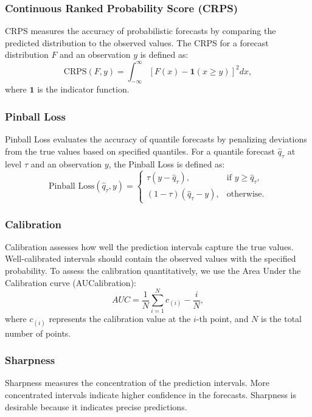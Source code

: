\documentclass{article}
\begin{document}
\subsubsection{Continuous Ranked Probability Score (CRPS)}
CRPS measures the accuracy of probabilistic forecasts by comparing the predicted distribution to the observed values. The CRPS for a forecast distribution \( F \) and an observation \( y \) is defined as:
\begin{equation}
\text{CRPS}(F, y) = \int_{-\infty}^\infty \left[ F(x) - \mathbf{1}(x \ge y) \right]^2 dx,
\end{equation}
where \( \mathbf{1} \) is the indicator function.

\subsubsection{Pinball Loss}
Pinball Loss evaluates the accuracy of quantile forecasts by penalizing deviations from the true values based on specified quantiles. For a quantile forecast \( \hat{q}_\tau \) at level \( \tau \) and an observation \( y \), the Pinball Loss is defined as:
\begin{equation}
\text{Pinball Loss}(\hat{q}_\tau, y) = \begin{cases}
\tau (y - \hat{q}_\tau), & \text{if } y \ge \hat{q}_\tau, \\
(1 - \tau) (\hat{q}_\tau - y), & \text{otherwise}.
\end{cases}
\end{equation}

\subsubsection{Calibration}
Calibration assesses how well the prediction intervals capture the true values. Well-calibrated intervals should contain the observed values with the specified probability. To assess the calibration quantitatively, we use the Area Under the Calibration curve (AUCalibration):
\begin{equation}
AUC = \frac{1}{N} \sum_{i=1}^N c_{(i)} - \frac{i}{N},
\end{equation}
where \(c_{(i)}\) represents the calibration value at the \(i\)-th point, and \(N\) is the total number of points.

\subsubsection{Sharpness}
Sharpness measures the concentration of the prediction intervals. More concentrated intervals indicate higher confidence in the forecasts. Sharpness is desirable because it indicates precise predictions.
\end{document}
